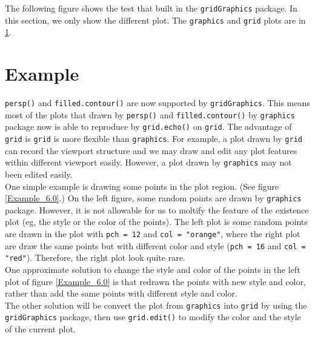 \documentclass[paper=a4, fontsize=11pt]{report}
\begin{document}
The following figure shows the test that built in the \texttt{gridGraphics} package. In this section, we only show the different plot. The \texttt{graphics} and \texttt{grid} plots are in \ref{}.\\



\chapter{Example}
\texttt{persp()} and \texttt{filled.contour()} are now supported by \texttt{gridGraphics}. This means most of the plots that drawn by \texttt{persp()} and \texttt{filled.contour()} by \texttt{graphics} package now is able to reproduce by \texttt{grid.echo()} on \texttt{grid}. The advantage of \texttt{grid} is \texttt{grid} is more flexible than \texttt{graphics}. For example, a plot drawn by \texttt{grid} can record the viewport structure and we may draw and edit any plot features within different viewport easily. However, a plot drawn by \texttt{graphics} may not been edited easily.\\

One simple example is drawing some points in the plot region. (See figure \ref{Example_6.0}.) On the left figure, some random points are drawn by \texttt{graphics} package. However, it is not allowable for us to moltify the feature of the existence plot (eg, the style or the color of the points). The left plot is some random points are drawn in the plot with \texttt{pch = 12} and \texttt{col = "orange"}, where the right plot are draw the same points but with different color and style (\texttt{pch = 16} and \texttt{col = "red"}). Therefore, the right plot look quite rare.\\

One approximate solution to change the style and color of the points in the left plot of figure \ref{Example_6.0} is that redrawn the points with new style and color, rather than add the same points with different style and color.\\

The other solution will be convert the plot from \texttt{graphics} into \texttt{grid} by using the \texttt{gridGraphics} package, then use \texttt{grid.edit()} to modify the color and the style of the current plot.\\
\end{document}
